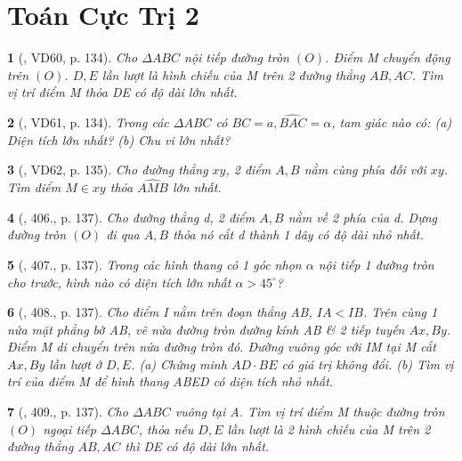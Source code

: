 \documentclass{article}
\newtheorem{baitoan}{}
\begin{document}

\section{Toán Cực Trị 2}

\begin{baitoan}[\cite{Binh_Toan_9_tap_2}, VD60, p. 134]
	Cho $\Delta ABC$ nội tiếp đường tròn $(O)$. Điểm M chuyển động trên $(O)$. $D,E$ lần lượt là hình chiếu của M trên 2 đường thẳng $AB,AC$. Tìm vị trí điểm M thỏa DE có độ dài lớn nhất.
\end{baitoan}

\begin{baitoan}[\cite{Binh_Toan_9_tap_2}, VD61, p. 134]
	Trong các $\Delta ABC$ có $BC = a,\widehat{BAC} = \alpha$, tam giác nào có: (a) Diện tích lớn nhất? (b) Chu vi lớn nhất?
\end{baitoan}

\begin{baitoan}[\cite{Binh_Toan_9_tap_2}, VD62, p. 135]
	Cho đường thẳng $xy$, 2 điểm $A,B$ nằm cùng phía đối với $xy$. Tìm điểm $M\in xy$ thỏa $\widehat{AMB}$ lớn nhất.
\end{baitoan}

\begin{baitoan}[\cite{Binh_Toan_9_tap_2}, 406., p. 137]
	Cho đường thẳng d, 2 điểm $A,B$ nằm về 2 phía của d. Dựng đường tròn $(O)$ đi qua $A,B$ thỏa nó cắt d thành 1 dây có độ dài nhỏ nhất.
\end{baitoan}

\begin{baitoan}[\cite{Binh_Toan_9_tap_2}, 407., p. 137]
	Trong các hình thang có 1 góc nhọn $\alpha$ nội tiếp 1 đường tròn cho trước, hình nào có diện tích lớn nhất $\alpha > 45^\circ$?
\end{baitoan}

\begin{baitoan}[\cite{Binh_Toan_9_tap_2}, 408., p. 137]
	Cho điểm I nằm trên đoạn thẳng AB, $IA < IB$. Trên cùng 1 nửa mặt phẳng bờ AB, vẽ nửa đường tròn đường kính AB \& 2 tiếp tuyến $Ax,By$. Điểm M di chuyển trên nửa đường tròn đó. Đường vuông góc với IM tại M cắt $Ax,By$ lần lượt ở $D,E$. (a) Chứng minh $AD\cdot BE$ có giá trị không đổi. (b) Tìm vị trí của điểm M để hình thang ABED có diện tích nhỏ nhất.
\end{baitoan}

\begin{baitoan}[\cite{Binh_Toan_9_tap_2}, 409., p. 137]
	Cho $\Delta ABC$ vuông tại A. Tìm vị trí điểm M thuộc đường tròn $(O)$ ngoại tiếp $\Delta ABC$, thỏa nếu $D,E$ lần lượt là 2 hình chiếu của M trên 2 đường thẳng $AB,AC$ thì DE có độ dài lớn nhất.
\end{baitoan}
\end{document}
